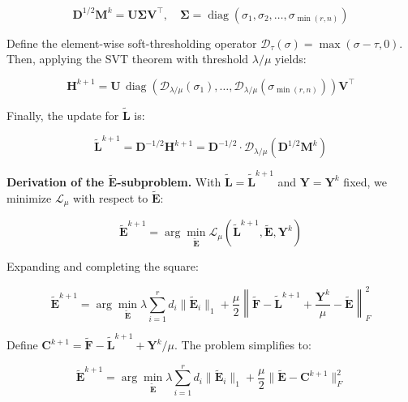 \begin{equation}
\mathbf{D}^{1/2} \mathbf{M}^k = \mathbf{U} \boldsymbol{\Sigma} \mathbf{V}^\top, \quad \boldsymbol{\Sigma} = \operatorname{diag}(\sigma_1, \sigma_2, \ldots, \sigma_{\min(r,n)})
\end{equation}

Define the element-wise soft-thresholding operator $\mathcal{D}_{\tau}(\sigma) = \max(\sigma - \tau, 0)$. Then, applying the SVT theorem with threshold $\lambda/\mu$ yields:

\begin{equation}
\mathbf{H}^{k+1} = \mathbf{U} \, \operatorname{diag}\left( \mathcal{D}_{\lambda / \mu}(\sigma_1), \ldots, \mathcal{D}_{\lambda / \mu}(\sigma_{\min(r,n)}) \right) \mathbf{V}^\top
\end{equation}

Finally, the update for $\tilde{\mathbf{L}}$ is:

\begin{equation}
\tilde{\mathbf{L}}^{k+1} = \mathbf{D}^{-1/2} \mathbf{H}^{k+1} = \mathbf{D}^{-1/2} \cdot \mathcal{D}_{\lambda / \mu}\left( \mathbf{D}^{1/2} \mathbf{M}^k \right)
\label{eq:L-update}
\end{equation}

\noindent\textbf{Derivation of the $\tilde{\mathbf{E}}$-subproblem.}
With $\tilde{\mathbf{L}} = \tilde{\mathbf{L}}^{k+1}$ and $\mathbf{Y} = \mathbf{Y}^k$ fixed, we minimize $\mathcal{L}_{\mu}$ with respect to $\tilde{\mathbf{E}}$:

\begin{equation}
\tilde{\mathbf{E}}^{k+1} = \arg\min_{\tilde{\mathbf{E}}} \mathcal{L}_{\mu}(\tilde{\mathbf{L}}^{k+1}, \tilde{\mathbf{E}}, \mathbf{Y}^k)
\end{equation}

Expanding and completing the square:

\begin{equation}
\tilde{\mathbf{E}}^{k+1} = \arg\min_{\tilde{\mathbf{E}}} \lambda \sum_{i=1}^r d_i \|\tilde{\mathbf{E}}_{i}\|_1 + \frac{\mu}{2} \left\| \tilde{\mathbf{F}} - \tilde{\mathbf{L}}^{k+1} + \frac{\mathbf{Y}^k}{\mu} - \tilde{\mathbf{E}} \right\|_F^2
\end{equation}

Define $\mathbf{C}^{k+1} = \tilde{\mathbf{F}} - \tilde{\mathbf{L}}^{k+1} + {\mathbf{Y}^k}/{\mu}$.
The problem simplifies to:

\begin{equation}
\tilde{\mathbf{E}}^{k+1} = \arg\min_{\tilde{\mathbf{E}}} \lambda \sum_{i=1}^r d_i \|\tilde{\mathbf{E}}_{i}\|_1 + \frac{\mu}{2} \|\tilde{\mathbf{E}} - \mathbf{C}^{k+1}\|_F^2
\end{equation}

